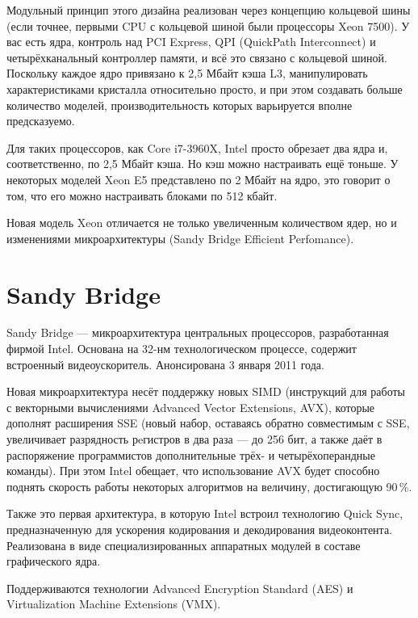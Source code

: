 \documentclass[a4paper,12pt,notitlepage,headsepline,pdftex]{scrartcl}
\begin{document}
Модульный принцип этого дизайна реализован через концепцию кольцевой шины
(если точнее, первыми CPU с кольцевой шиной были процессоры Xeon 7500).
У вас есть ядра, контроль над PCI Express, QPI (QuickPath Interconnect) и
четырёхканальный контроллер памяти, и всё это связано с кольцевой шиной.
Поскольку каждое ядро привязано к 2,5 Мбайт кэша L3, манипулировать
характеристиками кристалла относительно просто, и при этом создавать больше
количество моделей, производительность которых варьируется вполне
предсказуемо.

Для таких процессоров, как Core i7-3960X, Intel просто обрезает два ядра и,
соответственно, по 2,5 Мбайт кэша.
Но кэш можно настраивать ещё тоньше.
У некоторых моделей Xeon E5 представлено по 2 Мбайт на ядро, это говорит о
том, что его можно настраивать блоками по 512 кбайт.

  Новая модель Xeon отличается не только увеличенным количеством ядер, но и
  изменениями микроархитектуры (Sandy Bridge Efficient Perfomance).
\section{Sandy Bridge}
Sandy Bridge --- микроархитектура центральных процессоров, разработанная
фирмой Intel. Основана на 32-нм технологическом процессе, содержит встроенный
видеоускоритель.
Анонсирована 3 января 2011 года.

Новая микроархитектура несёт поддержку новых SIMD (инструкций для работы с
векторными вычислениями Advanced Vector Extensions, AVX), которые дополнят
расширения SSE (новый набор, оставаясь обратно совместимым с SSE, увеличивает
разрядность рeгистров в два раза --- до 256 бит, а также даёт в распоряжение
программистов дополнительные трёх- и четырёхоперандные команды).
При этом Intel обещает, что использование AVX будет способно поднять скорость
работы некоторых алгоритмов на величину, достигающую 90\,\%.

Также это первая архитектура, в которую Intel встроил технологию Quick Sync,
предназначенную для ускорения кодирования и декодирования видеоконтента.
Реализована в виде специализированных аппаратных модулей в составе
графического ядра.

Поддерживаются технологии Advanced Encryption Standard (AES) и Virtualization
Machine Extensions (VMX).
\end{document}
